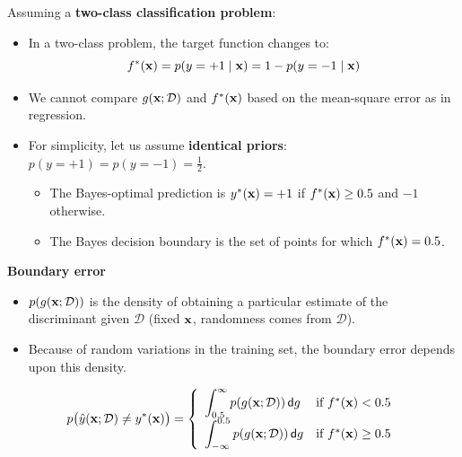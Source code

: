   Assuming a \textbf {two-class classification problem}:
  \begin{itemize}
    \item In a two-class problem, the target function changes to:
      \begin{displaymath}
        f^*(\bm{\mathrm{x}}) = p(y = +1 \mid \bm{\mathrm{x}}) = 1 - p(y = -1 \mid \bm{\mathrm{x}})
      \end{displaymath}
                 
    \item We cannot compare $g(\bm{\mathrm{x}} ; {\mathcal{D}})$ and $f^*(\bm{\mathrm{x}})$ based on the mean-square error as in regression.
    \item For simplicity, let us assume \textbf{identical priors}: $p(y=+1)=p(y=-1)=\frac{1}{2}$.
      \begin{itemize}
        \item The Bayes-optimal prediction is $y^*(\bm{\mathrm{x}})=+1$ if $f^*(\bm{\mathrm{x}})\ge 0.5$ and $-1$ otherwise.
        \item The Bayes decision boundary is the set of points for which $f^*(\bm{\mathrm{x}}) = 0.5$.
      \end{itemize}
  \end{itemize}
 \textbf{Boundary error}
    \begin{itemize}
    \item $p(g(\bm{\mathrm{x}}; \mathcal{D}))$ is the density of obtaining a particular estimate of the discriminant given $\mathcal{D}$ (fixed $\bm{\mathrm{x}}$, randomness comes from $\mathcal D$).
    \item Because of random variations in the training set, the boundary error depends upon this density.
  \end{itemize}

  \begin{displaymath}
    p\big(\hat y(\bm{\mathrm{x}};\mathcal D) \ne y^*(\bm{\mathrm{x}})\big) =
     \left\{
       \begin{array}{l l}
         \displaystyle{ \int_{0.5}^\infty p(g(\ensuremath{\bm{\mathrm{x}}}; \mathcal{D})) \, \mathsf{d}g } & \mbox{if~} f^*(\bm{\mathrm{x}}) < 0.5 \\
         \displaystyle{ \int_{-\infty}^{0.5} p(g(\ensuremath{\bm{\mathrm{x}}}; \mathcal{D})) \, \mathsf{d}g } & \mbox{if~} f^*(\bm{\mathrm{x}}) \ge 0.5
       \end{array}
     \right.
  \end{displaymath}

